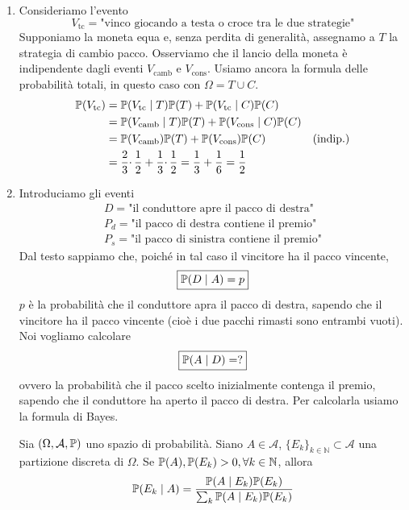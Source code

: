 \begin{enumerate}
	\item Consideriamo l'evento
	\begin{equation*}
		V_{\text{tc}} =\text{"vinco giocando a testa o croce tra le due strategie"}
	\end{equation*}
	Supponiamo la moneta equa e, senza perdita di generalità, assegnamo a $T$ la strategia di cambio pacco. Osserviamo che il lancio della moneta è indipendente dagli eventi $V_{\text{camb}}$ e $V_{\text{cons}}$. Usiamo ancora la formula delle probabilità totali, in questo caso con $\Omega =T\cup C$.
	\begin{align*}
		\mathbb{P}( V_{\text{tc}}) & =\mathbb{P}( V_{\text{tc}} \mid T)\mathbb{P}( T) +\mathbb{P}( V_{\text{tc}} \mid C)\mathbb{P}( C) & \\
		 & =\mathbb{P}( V_{\text{camb}} \mid T)\mathbb{P}( T) +\mathbb{P}( V_{\text{cons}} \mid C)\mathbb{P}( C) & \\
		 & =\mathbb{P}( V_{\text{camb}})\mathbb{P}( T) +\mathbb{P}( V_{\text{cons}})\mathbb{P}( C) & \text{(indip.)}\\
		 & =\frac{2}{3} \cdotp \frac{1}{2} +\frac{1}{3} \cdotp \frac{1}{2} =\frac{1}{3} +\frac{1}{6} =\frac{1}{2} & 
	\end{align*}
	\item Introduciamo gli eventi
	\begin{gather*}
		D=\text{"il conduttore apre il pacco di destra"}\\
		P_{d} =\text{"il pacco di destra contiene il premio"}\\
		P_{s} =\text{"il pacco di sinistra contiene il premio"}
	\end{gather*}
	Dal testo sappiamo che, poiché in tal caso il vincitore ha il pacco vincente,
	\begin{equation*}
		\boxed{\mathbb{P}( D\mid A) =p}
	\end{equation*}
	$p$ è la probabilità che il conduttore apra il pacco di destra, sapendo che il vincitore ha il pacco vincente (cioè i due pacchi rimasti sono entrambi vuoti). Noi vogliamo calcolare
	\begin{equation*}
		\boxed{\mathbb{P}( A\mid D) =?}
	\end{equation*}
	ovvero la probabilità che il pacco scelto inizialmente contenga il premio, sapendo che il conduttore ha aperto il pacco di destra. Per calcolarla usiamo la formula di Bayes.
	\begin{theorem}
		Sia $( \Omega ,\mathcal{A} ,\mathbb{P})$ uno spazio di probabilità. Siano $A\in \mathcal{A}$, $\{E_{k}\}_{k\in \mathbb{N}} \subset \mathcal{A}$ una partizione discreta di $\Omega $. Se $\mathbb{P}( A) ,\mathbb{P}( E_{k})  >0,\forall k\in \mathbb{N}$, allora
		\begin{equation*}
			\mathbb{P}( E_{k} \mid A) =\frac{\mathbb{P}( A\mid E_{k})\mathbb{P}( E_{k})}{\sum_{k}\mathbb{P}( A\mid E_{k})\mathbb{P}( E_{k})}
		\end{equation*}
	\end{theorem}


\end{enumerate}
